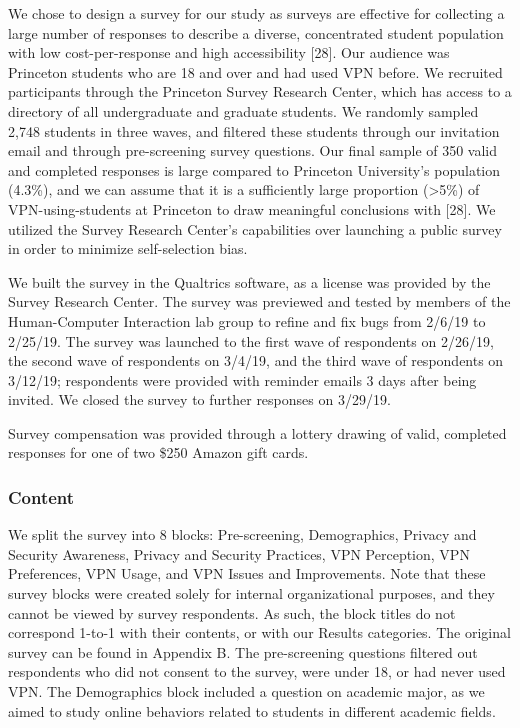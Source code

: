We chose to design a survey for our study as surveys are effective for collecting a large number of responses to describe a diverse, concentrated student population with low cost-per-response and high accessibility [28]. Our audience was Princeton students who are 18 and over and had used VPN before. We recruited participants through the Princeton Survey Research Center, which has access to a directory of all undergraduate and graduate students. We randomly sampled 2,748 students in three waves, and filtered these students through our invitation email and through pre-screening survey questions. Our final sample of 350 valid and completed responses is large compared to Princeton University’s population (4.3\%), and we can assume that it is a sufficiently large proportion (>5\%) of VPN-using-students at Princeton to draw meaningful conclusions with [28]. We utilized the Survey Research Center’s capabilities over launching a public survey in order to minimize self-selection bias.

We built the survey in the Qualtrics software, as a license was provided by the Survey Research Center. The survey was previewed and tested by members of the Human-Computer Interaction lab group to refine and fix bugs from 2/6/19 to 2/25/19. The survey was launched to the first wave of respondents on 2/26/19, the second wave of respondents on 3/4/19, and the third wave of respondents on 3/12/19; respondents were provided with reminder emails 3 days after being invited. We closed the survey to further responses on 3/29/19.

Survey compensation was provided through a lottery drawing of valid, completed responses for one of two \$250 Amazon gift cards.

\subsubsection{Content}

We split the survey into 8 blocks: Pre-screening, Demographics, Privacy and Security Awareness, Privacy and Security Practices, VPN Perception, VPN Preferences, VPN Usage, and VPN Issues and Improvements. Note that these survey blocks were created solely for internal organizational purposes, and they cannot be viewed by survey respondents. As such, the block titles do not correspond 1-to-1 with their contents, or with our Results categories. The original survey can be found in Appendix B.
The pre-screening questions filtered out respondents who did not consent to the survey, were under 18, or had never used VPN. The Demographics block included a question on academic major, as we aimed to study online behaviors related to students in different academic fields.

